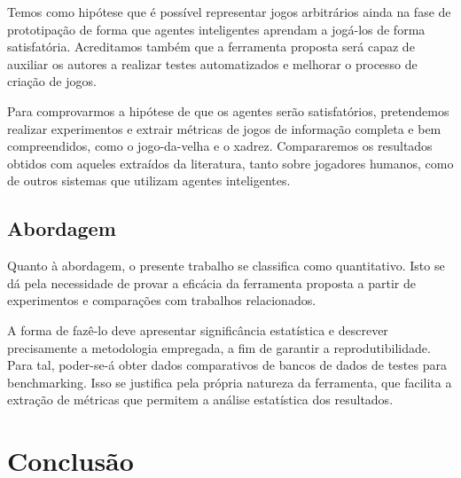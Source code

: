 \documentclass[12pt]{article}
\begin{document}
Temos como hipótese que é possível representar jogos arbitrários ainda na fase de prototipação de forma que agentes inteligentes aprendam a jogá-los de forma satisfatória.
Acreditamos também que a ferramenta proposta será capaz de auxiliar os autores a realizar testes automatizados e melhorar o processo de criação de jogos.

Para comprovarmos a hipótese de que os agentes serão satisfatórios, pretendemos realizar experimentos e extrair métricas de jogos de informação completa e bem compreendidos, como o jogo-da-velha e o xadrez.
Compararemos os resultados obtidos com aqueles extraídos da literatura, tanto sobre jogadores humanos, como de outros sistemas que utilizam agentes inteligentes.

\subsection{Abordagem}

Quanto à abordagem, o presente trabalho se classifica como quantitativo.
Isto se dá pela necessidade de provar a eficácia da ferramenta proposta a partir de experimentos e comparações com trabalhos relacionados.

A forma de fazê-lo deve apresentar significância estatística e descrever precisamente a metodologia empregada, a fim de garantir a reprodutibilidade.
Para tal, poder-se-á obter dados comparativos de bancos de dados de testes para benchmarking.
Isso se justifica pela própria natureza da ferramenta, que facilita a extração de métricas que permitem a análise estatística dos resultados.

\section{Conclusão}%
\label{sec:conclusao}


\printbibliography{}
\end{document}
